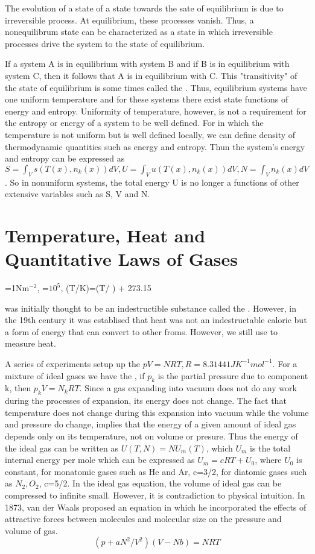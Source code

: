 The evolution of a state of a state towards the sate of equilibrium is due to irreversible process. At equilibrium, these processes 
vanish. Thus, a nonequilibrum state can be characterized as a state in which irreversible processes drive the system to the state
of equilibrium.  

If a system A is in equilibrium with system B and if B is in equilibrium with system C, then it follows that A is in equilibrium 
with C. This "transitivity" of the state of equilibrium is some times called the . Thus, equilibrium systems have
one uniform temperature and for these systems there exist state functions of energy and entropy. Uniformity of temperature, however,
is not a requirement for the entropy or energy of a system to be well defined. For  in which the 
temperature is not uniform but is well defined locally, we can define density of thermodynamic quantities such as energy and entropy.
Thun the system's energy and entropy can be expressed as $S=\int_Vs(T(x),n_k(x))dV, U=\int_Vu(T(x),n_k(x))dV,N=\int_Vn_k(x)dV$. So
in nonuniform systems, the total energy U is no longer a functions of other extensive variables such as S, V and N.

\section{Temperature, Heat and Quantitative Laws of Gases}
\begin{definition}
=1N$\mathrm{m}^{-2}$, =$10^5$, (T/K)=(T/ \textcelsius ) + 273.15
\end{definition}
 was initially thought to be an indestructible substance called the . However, in the 19th century it was establised
that heat was not an indestructable caloric but a form of energy that can convert to other froms. However, we still use  to 
measure heat.

A series of experiments setup up the  $pV=NRT, R=8.31441JK^{-1}mol^{-1}$. For a mixture of ideal gases we have the
, if $p_k$ is the partial pressure due to component k, then $p_kV=N_kRT$. Since a gas expanding into
vacuum does not do any work during the processes of expansion, its energy does not change. The fact that temperature does not change 
during this expansion into vacuum while the volume and pressure do change, implies that the energy of a given amount of ideal gas depends
only on its temperature, not on volume or presure. Thus the energy of the ideal gas can be written as $U(T,N)=NU_m(T)$, which $U_m$ is the
total internal energy per mole which can be expressed as $U_m=cRT+U_0$, where $U_0$ is constant, for monatomic gases such as He and Ar,
c=3/2, for diatomic gases such as $N_2,O_2$, c=5/2. In the ideal gas equation, the volume of ideal gas can be compressed to infinite small.
However, it is contradiction to physical intuition. In 1873, van der Waals proposed an equation in which he incorporated the effects of
attractive forces between molecules and molecular size on the pressure and volume of gas. 
\begin{equation}
(p+aN^2/V^2)(V-Nb)=NRT
\end{equation}

